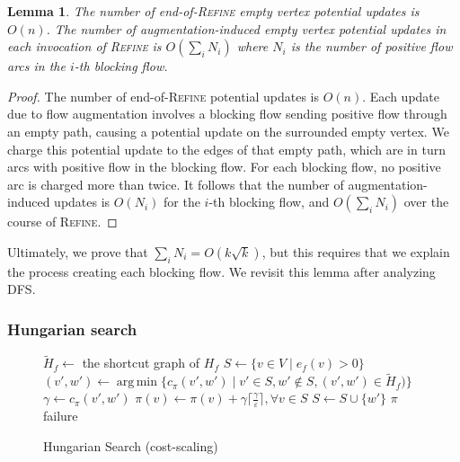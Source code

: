 \documentclass[11pt]{article}
\def\eps{\varepsilon}
\DeclareMathOperator*{\argmin}{arg\,min}
\theoremstyle{plain}
\newtheorem{lemma}{Lemma}[section]
\numberwithin{figure}{section}
\begin{document}
\begin{lemma}
\label{lemma:empty_updates}
The number of end-of-\textsc{Refine} empty vertex potential updates is $O(n)$.
The number of augmentation-induced empty vertex potential updates in each
invocation of \textsc{Refine} is $O(\sum_i N_i)$ where $N_i$ is the number
of positive flow arcs in the $i$-th blocking flow.
\end{lemma}

\begin{proof}
The number of end-of-\textsc{Refine} potential updates is $O(n)$.
Each update due to flow augmentation involves a blocking flow sending positive
flow through an empty path, causing a potential update on the surrounded
empty vertex.
We charge this potential update to the edges of that empty path, which are in
turn arcs with positive flow in the blocking flow.
For each blocking flow, no positive arc is charged more than twice.
It follows that the number of augmentation-induced updates is $O(N_i)$ for the
$i$-th blocking flow, and $O(\sum_i N_i)$ over the course of \textsc{Refine}.
\end{proof}

Ultimately, we prove that $\sum_i N_i = O(k\sqrt{k})$, but this requires that
we explain the process creating each blocking flow.
We revisit this lemma after analyzing \textsc{DFS}.

\subsubsection{Hungarian search}

\begin{figure*}
\centering
\begin{minipage}{.8\linewidth}
\begin{algorithm}[H]
\caption{Hungarian Search (cost-scaling)}
\begin{algorithmic}[1]
	\State $\tilde{H}_f \gets$ the shortcut graph of $H_f$
	\State $S \gets \{v \in V \mid e_f(v) > 0\}$
	\Repeat
		\State $(v', w') \gets \argmin\{c_\pi(v', w') \mid v' \in S, w' \not\in S, (v', w') \in \tilde{H}_f)\}$
			\label{line:hs_relaxation}
		\State $\gamma \gets c_\pi(v', w')$
			\State $\pi(v) \gets \pi(v) + \gamma\lceil\frac{\gamma}{\eps}\rceil, \forall v \in S$
		\EndIf
		\State $S \gets S \cup \{w'\}$
		 
			\State\Return $\pi$
		\EndIf
	\State\Return failure
\EndFunction
\end{algorithmic}
\end{algorithm}
\end{minipage}
\end{figure*}
\end{document}
